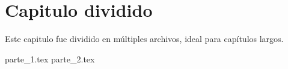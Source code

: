 \chapter{Capitulo dividido}
    Este capitulo fue dividido en múltiples archivos, ideal para capítulos largos.

    
    {parte_1.tex}
    {parte_2.tex}